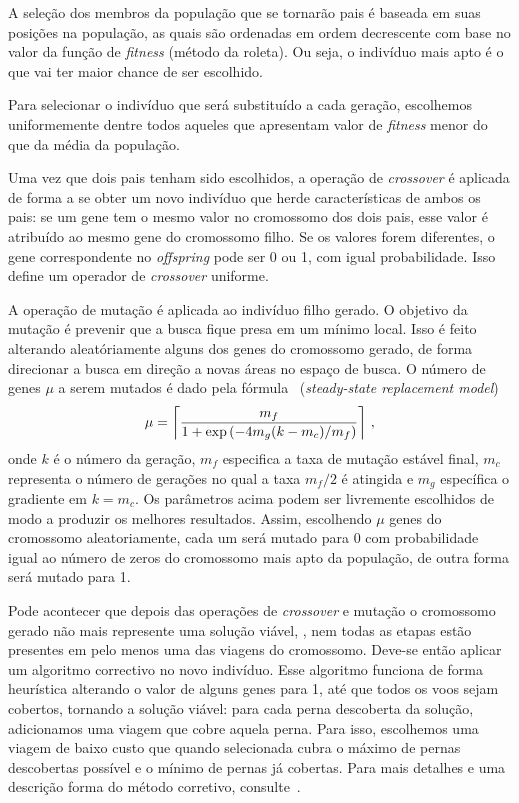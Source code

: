 A seleção dos membros da população que se tornarão pais é baseada em suas posições na população, as
quais são ordenadas em ordem decrescente com base no valor da função de {\it fitness} (método da
roleta). Ou seja, o indivíduo mais apto é o que vai ter maior chance de ser escolhido.

Para selecionar o indivíduo que será substituído a cada geração, escolhemos uniformemente dentre
todos aqueles que apresentam valor de {\it fitness} menor do que da média da população.

Uma vez que dois pais tenham sido escolhidos, a operação de {\it crossover} é aplicada de forma a
se obter um novo indivíduo que herde características de ambos os pais: se um gene tem o mesmo valor
no cromossomo dos dois pais, esse valor é atribuído ao mesmo gene do cromossomo filho. Se os valores
forem diferentes, o gene correspondente no {\it offspring} pode ser 0 ou 1, com igual probabilidade.
Isso define um operador de {\it crossover} uniforme.

A operação de mutação é aplicada ao indivíduo filho gerado. O objetivo da mutação é prevenir que a
busca fique presa em um mínimo local. Isso é feito alterando aleatóriamente alguns dos genes do
cromossomo gerado, de forma direcionar a busca em direção a novas áreas no espaço de busca. O número
de genes $\mu$ a serem mutados é dado pela fórmula~\cite{beasley95} ({\it steady-state replacement
model})
%
\begin{equation*}
\mu	= \left\lceil \frac{m_f}{1+\exp{\left(-4m_g(k - m_c)/m_f\right)}} \right\rceil \, ,
\end{equation*}
%
onde $k$ é o número da geração, $m_f$ especifica a taxa de mutação estável final, $m_c$ representa o
número de gerações no qual a taxa $m_f/2$ é atingida e $m_g$ específica o gradiente em $k = m_c$. Os
parâmetros acima podem ser livremente escolhidos de modo a produzir os melhores resultados. Assim,
escolhendo $\mu$ genes do cromossomo aleatoriamente, cada um será mutado para 0 com probabilidade
igual ao número de zeros do cromossomo mais apto da população, de outra forma será mutado para 1.

Pode acontecer que depois das operações de {\it crossover} e mutação o cromossomo gerado não mais
represente uma solução viável, \ie, nem todas as etapas estão presentes em pelo menos uma das
viagens do cromossomo. Deve-se então aplicar um algoritmo correctivo no novo indivíduo. Esse
algoritmo funciona de forma heurística alterando o valor de alguns genes para 1, até que todos os
voos sejam cobertos, tornando a solução viável: para cada perna descoberta da solução, adicionamos
uma viagem que cobre aquela perna. Para isso, escolhemos uma viagem de baixo custo que quando
selecionada cubra o máximo de pernas descobertas possível e o mínimo de pernas já cobertas. Para
mais detalhes e uma descrição forma do método corretivo, consulte~\cite{beasley95}.

